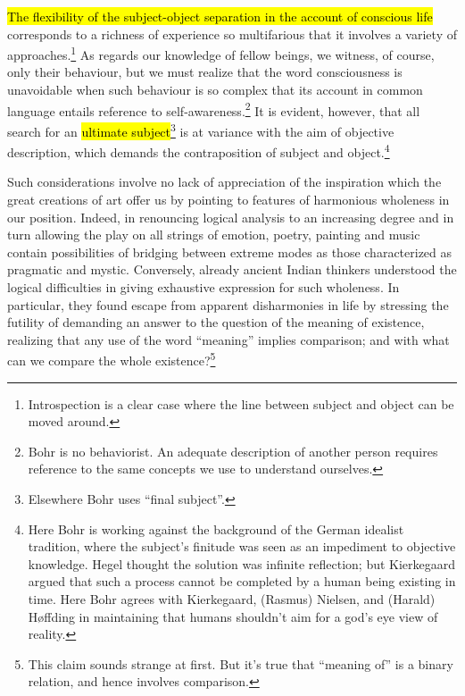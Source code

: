 \documentclass{tufte-handout}
\begin{document}
\hl{The flexibility of the subject-object separation in the account of
  conscious life} corresponds to a richness of experience so
multifarious that it involves a variety of
approaches.\footnote{Introspection is a clear case where the line
  between subject and object can be moved around.} As regards our
knowledge of fellow beings, we witness, of course, only their
behaviour, but we must realize that the word consciousness is
unavoidable when such behaviour is so complex that its account in
common language entails reference to self-awareness.\footnote{Bohr is
  no behaviorist. An adequate description of another person requires
  reference to the same concepts we use to understand ourselves.} It
is evident, however, that all search for an \hl{ultimate
  subject}\footnote{Elsewhere Bohr uses ``final subject''.} is at
variance with the aim of objective description, which demands the
contraposition of subject and object.\footnote{Here Bohr is working
  against the background of the German idealist tradition, where the
  subject's finitude was seen as an impediment to objective
  knowledge. Hegel thought the solution was infinite reflection; but
  Kierkegaard argued that such a process cannot be completed by a
  human being existing in time. Here Bohr agrees with Kierkegaard,
  (Rasmus) Nielsen, and (Harald) Høffding in maintaining that humans
  shouldn't aim for a god's eye view of reality.}

Such considerations involve no lack of appreciation of the inspiration
which the great creations of art offer us by pointing to features of
harmonious wholeness in our position. Indeed, in renouncing logical
analysis to an increasing degree and in turn allowing the play on all
strings of emotion, poetry, painting and music contain possibilities
of bridging between extreme modes as those characterized as pragmatic
and mystic. Conversely, already ancient Indian thinkers understood the
logical difficulties in giving exhaustive expression for such
wholeness. In particular, they found escape from apparent disharmonies
in life by stressing the futility of demanding an answer to the
question of the meaning of existence, realizing that any use of the
word ``meaning'' implies comparison; and with what can we compare the
whole existence?\footnote{This claim sounds strange at first. But it's
  true that ``meaning of'' is a binary relation, and hence involves
  comparison.}
\end{document}
